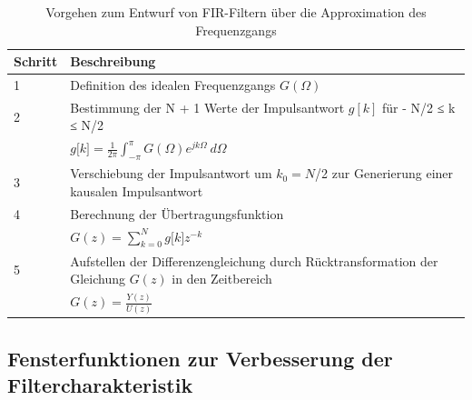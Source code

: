 \begin{table}
  \centering
  \caption{Vorgehen zum Entwurf von FIR-Filtern über die Approximation des Frequenzgangs}
  \label{tab:9.7}
  \begin{tabular}{ll}
    \toprule
    Schritt & Beschreibung \\
    \midrule
    1 & Definition des idealen Frequenzgangs \(G(Ω)\) \\
    2 & Bestimmung der N + 1 Werte der Impulsantwort \(g[k]\) für - N/2 ≤ k ≤ N/2 \\
    & \(g\lbrack k\rbrack = \frac{1}{2  \pi}  \int_{- \pi}^{\pi}{G(\Omega)  e^{j  k  \Omega}\ d\Omega}\) \\
    3 & Verschiebung der Impulsantwort um \(k_{0} = N\)/2 zur Generierung einer kausalen Impulsantwort \\
    4 & Berechnung der Übertragungsfunktion \\
    & \(G(z) = \sum\limits_{k = 0}^{N}{g\lbrack k\rbrack  z^{- k}}\) \\
    5 & Aufstellen der Differenzengleichung durch Rücktransformation der Gleichung \(G(z)\) in den Zeitbereich \\
    & \(G(z) = \frac{Y(z)}{U(z)}\) \\
    \bottomrule
  \end{tabular}
\end{table}

\subsection{Fensterfunktionen zur Verbesserung der Filtercharakteristik}\label{sec:fensterfunktionen-zur-verbesserung-der-filtercharakteristik}

